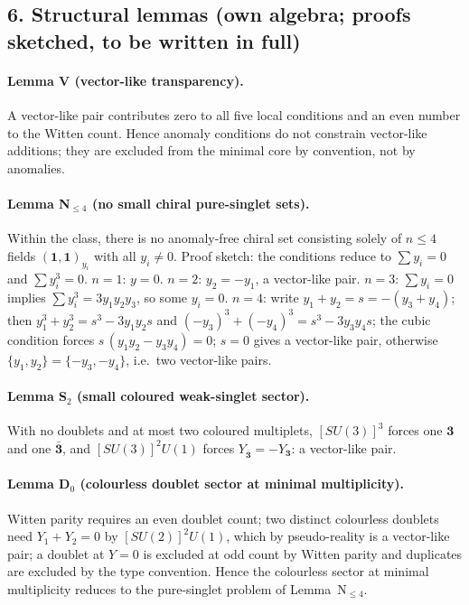 \subsection*{6. Structural lemmas (own algebra; proofs sketched,
to be written in full)}
\paragraph{Lemma V (vector-like transparency).}
A vector-like pair contributes zero to all five local conditions
and an even number to the Witten count.
Hence anomaly conditions do not constrain vector-like additions;
they are excluded from the minimal core by convention, not by
anomalies.
\paragraph{Lemma N$_{\le4}$ (no small chiral pure-singlet sets).}
Within the class, there is no anomaly-free chiral set consisting
solely of $n\le4$ fields $(\mathbf 1,\mathbf 1)_{y_i}$ with all
$y_i\neq0$.
Proof sketch: the conditions reduce to $\sum y_i=0$ and
$\sum y_i^3=0$.
$n=1$: $y=0$.
$n=2$: $y_2=-y_1$, a vector-like pair.
$n=3$: $\sum y_i=0$ implies $\sum y_i^3=3y_1y_2y_3$, so some
$y_i=0$.
$n=4$: write $y_1+y_2=s=-(y_3+y_4)$; then
$y_1^3+y_2^3=s^3-3y_1y_2s$ and
$(-y_3)^3+(-y_4)^3=s^3-3y_3y_4s$; the cubic condition forces
$s\,(y_1y_2-y_3y_4)=0$; $s=0$ gives a vector-like pair, otherwise
$\{y_1,y_2\}=\{-y_3,-y_4\}$, i.e.\ two vector-like pairs.
\paragraph{Lemma S$_2$ (small coloured weak-singlet sector).}
With no doublets and at most two coloured multiplets, $[SU(3)]^3$
forces one $\mathbf 3$ and one $\bar{\mathbf 3}$, and
$[SU(3)]^2U(1)$ forces $Y_{\bar{\mathbf 3}}=-Y_{\mathbf 3}$: a
vector-like pair.
\paragraph{Lemma D$_0$ (colourless doublet sector at minimal
multiplicity).}
Witten parity requires an even doublet count; two distinct
colourless doublets need $Y_1+Y_2=0$ by $[SU(2)]^2U(1)$, which by
pseudo-reality is a vector-like pair; a doublet at $Y=0$ is
excluded at odd count by Witten parity and duplicates are excluded
by the type convention.
Hence the colourless sector at minimal multiplicity reduces to the
pure-singlet problem of Lemma~N$_{\le4}$.

